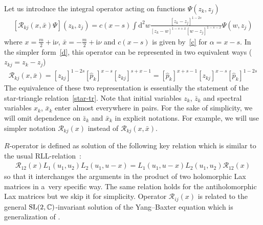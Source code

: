 \documentclass[10pt,a4paper]{amsart}
\renewcommand{\imath}{\mathrm{i}}
\numberwithin{equation}{section}
\begin{document}
Let us introduce the integral operator acting on functions $\Psi(z_k, z_j)$
\begin{align} \label{R}
 [\mathcal{R}_{k j}(x,\bar{x}) \Psi ](z_k, z_j) =
	c(x-s)
	\int \mathrm{d}^2 w
	\frac{[z_k-z_j]^{1-2s}}{[z_k-w]^{1-s+x} [w-z_j]^{1-s-x}}
	\Psi(w,z_j)
\end{align}
where $x = \frac{m}{2}+\imath\nu$, $\bar{x} = -\frac{m}{2}+\imath\nu$ and
$c(x-s)$ is given by~\eqref{c} for $\alpha=x-s$.
In the simpler form~\eqref{d}, this operator
can be represented in two equivalent ways ($z_{kj} = z_k-z_j$)
\begin{align}\label{R1}
\mathcal{R}_{k j}(x,\bar{x}) =
[z_{kj}]^{1-2s} [\hat{p}_k]^{x-s} [z_{kj}]^{s+x-1} =
[\hat{p}_k]^{x+s-1} [z_{kj}]^{x-s}
 [\hat{p}_k]^{1-2s}
\end{align}
The equivalence of these two representation
is essentially the statement of the star-triangle
relation~\eqref{star-tr}.
Note that initial variables $z_k$, $\bar{z}_k$ and spectral variables
$x_k$, $\bar{x}_k$ enter almost everywhere in pairs.
For the sake of simplicity, we will omit dependence on $\bar{z}_k$
and $\bar{x}_k$ in explicit notations. For example, we will
use simpler notation $\mathcal{R}_{k j}(x)$ instead of
$\mathcal{R}_{k j}(x,\bar{x})$.

$R$-operator is defined as solution of the following key relation which is similar to the usual RLL-relation~\cite{KRS}:
\begin{align}\label{defR}
\mathcal{R}_{1 2}(x) L_1(u_1, u_2) L_2(u_1, u-x) =
L_1(u_1, u-x) L_2(u_1, u_2) \mathcal{R}_{1 2}(x)
\end{align}
so that it interchanges the arguments in the product of
two holomorphic Lax matrices in a~very specific way.
The same relation holds for the antiholomorphic Lax matrices
but we skip it for simplicity.
Operator $\mathcal{R}_{i j}(x)$ is related to the general ${\rm SL}(2,\mathbb{C})$-invariant solution of the Yang--Baxter equation \cite{D1,DM1} which is generalization of \cite{KRS}.
\end{document}
